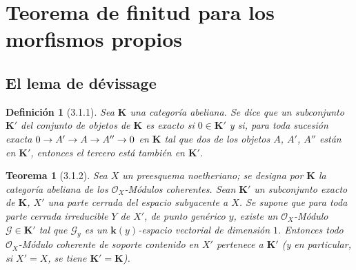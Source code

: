 \documentclass[10pt,oneside,openany]{book}
\theoremstyle{egaenv}\newtheorem*{env}{---}
\theoremstyle{egastatement}
\newtheorem*{theorem}{Teorema}
\theoremstyle{egadescription}
\newtheorem*{definition}{Definición}
\renewcommand{\to}{\mathchoice{\longrightarrow}{\rightarrow}{\rightarrow}{\rightarrow}}
\begin{document}
\section{Teorema de finitud para los morfismos propios}
\label{section:III.3}
\label{section:III.3-fr}

\subsection{El lema de d\'evissage}
\label{subsection:III.3.1}
\label{subsection:III.3.1-fr}

\begin{definition}[3.1.1]
\label{III.3.1.1-fr}
Sea $\boldsymbol{K}$ una categoría abeliana. Se dice que un subconjunto $\boldsymbol{K}'$ del
conjunto de objetos de $\boldsymbol{K}$ es exacto si $0\in\boldsymbol{K}'$ y si, para toda
sucesión exacta
$0\to A'\to A\to A''\to0$
en $\boldsymbol{K}$ tal que dos de los objetos $A$, $A'$, $A''$ están en $\boldsymbol{K}'$, entonces el
tercero está también en $\boldsymbol{K}'$.
\end{definition}

\begin{theorem}[3.1.2]
\label{III.3.1.2-fr}
Sea $X$ un preesquema noetheriano; se designa por $\boldsymbol{K}$ la categoría abeliana
de los $\mathcal O_X$-Módulos coherentes. Sean $\boldsymbol{K}'$ un subconjunto exacto de
$\boldsymbol{K}$, $X'$ una parte cerrada del espacio subyacente a $X$. Se supone que
para toda parte cerrada irreducible $Y$ de $X'$, de punto genérico $y$,
existe un $\mathcal O_X$-Módulo $\mathcal G\in\boldsymbol{K}'$ tal que $\mathcal G_y$ es
un $\boldsymbol{k}(y)$-espacio vectorial de dimensión $1$. Entonces todo $\mathcal O_X$-Módulo
coherente de soporte contenido en $X'$ pertenece a $\boldsymbol{K}'$ (y en particular,
si $X'=X$, se tiene $\boldsymbol{K}'=\boldsymbol{K}$).
\end{theorem}
\end{document}
